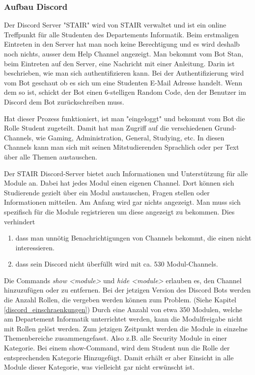 \documentclass[a4paper, table]{article}
\begin{document}
\subsubsection{Aufbau Discord}
Der Discord Server "STAIR" wird von STAIR verwaltet und ist ein online Treffpunkt f\"ur alle Studenten des Departements Informatik.
Beim erstmaligen Eintreten in den Server hat man noch keine Berechtigung und es wird deshalb noch nichts, ausser dem Help Channel
angezeigt. Man bekommt vom Bot Stan, beim Eintreten auf den Server, eine Nachricht mit einer Anleitung. Darin ist beschrieben, wie
man sich authentifizieren kann. Bei der Authentifizierung wird vom Bot geschaut ob es sich um eine Studenten E-Mail Adresse handelt.
Wenn dem so ist, schickt der Bot einen 6-stelligen Random Code, den der Benutzer im Discord dem Bot zur\"uckschreiben muss.

Hat dieser Prozess funktioniert, ist man "eingeloggt" und bekommt vom Bot die Rolle Student zugeteilt. Damit hat man Zugriff auf
die verschiedenen Grund-Channels, wie Gaming, Administration, General, Studying, etc.
In diesen Channels kann man sich mit seinen Mitstudierenden Sprachlich oder per Text \"uber alle Themen austauschen.
\newline

Der STAIR Discord-Server bietet auch Informationen und Unterst\"utzung f\"ur alle Module an. Dabei hat jedes Modul einen eigenen Channel.
Dort k\"onnen sich Studierende gezielt \"uber ein Modul austauschen, Fragen stellen oder Informationen mitteilen.
Am Anfang wird gar nichts angezeigt. Man muss sich spezifisch f\"ur die Module registrieren um diese angezeigt zu bekommen. Dies verhindert

\begin{enumerate}
    \item dass man unn\"otig Benachrichtigungen von Channels bekommt, die einen nicht interessieren.
    \item dass sein Discord nicht \"uberf\"ullt wird mit ca. 530 Modul-Channels.
\end{enumerate}

Die Commands \textit{show <module>} und \textit{hide <module>} erlauben es, den Channel hinzuzuf\"ugen oder zu entfernen.
Bei der jetzigen Version des Discord Bots werden die Anzahl Rollen, die vergeben werden können zum Problem.
(Siehe Kapitel \ref{discord_einschraenkungen})
Durch eine Anzahl von etwa 350 Modulen, welche am Departement Informatik unterrichtet werden, 
kann die Modulfreigabe nicht mit Rollen gelöst werden.
Zum jetzigen Zeitpunkt werden die Module in einzelne Themenbereiche zusammengefasst.
Also z.B. alle Security Module in einer Kategorie.
Bei einem show-Command, wird dem Student nun die Rolle der entsprechenden Kategorie Hinzugefügt.
Damit erhält er aber Einsicht in alle Module dieser Kategorie, was vielleicht gar nicht erwünscht ist.
\newline
\end{document}
